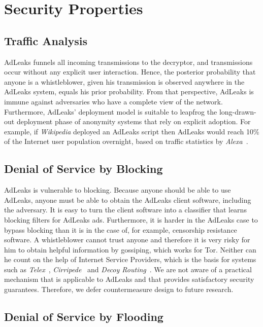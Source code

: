\documentclass[twocolumn,10pt]{article}
\begin{document}
\section{Security Properties}

\subsection{Traffic Analysis}

AdLeaks funnels all incoming transmissions to the decryptor, and
transmissions occur without any explicit user interaction.  Hence, the
posterior probability that anyone is a whistleblower, given his transmission
is observed anywhere in the AdLeaks system, equals his prior probability.
From that perspective, AdLeaks is immune against adversaries who have a
complete view of the network.  Furthermore, AdLeaks' deployment model is
suitable to leapfrog the long-drawn-out deployment phase of anonymity
systems that rely on explicit adoption.  For example, if \emph{Wikipedia}
deployed an AdLeaks script then AdLeaks would reach 10\% of the Internet
user population overnight, based on traffic statistics by
\emph{Alexa}~\cite{Alexa.com}.


\subsection{Denial of Service by Blocking}
\label{sec:br}  

AdLeaks is vulnerable to blocking.  Because anyone should be able to use
AdLeaks, anyone must be able to obtain the AdLeaks client software,
including the adversary.  It is easy to turn the client software into a
classifier that learns blocking filters for AdLeaks ads.  Furthermore, it is
harder in the AdLeaks case to bypass blocking than it is in the case of, for
example, censorship resistance software.  A whistleblower cannot trust
anyone and therefore it is very risky for him to obtain helpful information
by gossiping, which works for Tor.  Neither can he count on the help of
Internet Service Providers, which is the basis for systems such as
\emph{Telex}~\cite{WustrowWGH2011},
\emph{Cirripede}~\cite{HoumansadrNCB2011} and \emph{Decoy
  Routing}~\cite{KarlinEJJLMS2011}.  We are not aware of a practical
mechanism that is applicable to AdLeaks and that provides satisfactory
security guarantees.  Therefore, we defer countermeasure design to future
research.


\subsection{Denial of Service by Flooding}
\label{sec:dos} 
\end{document}
